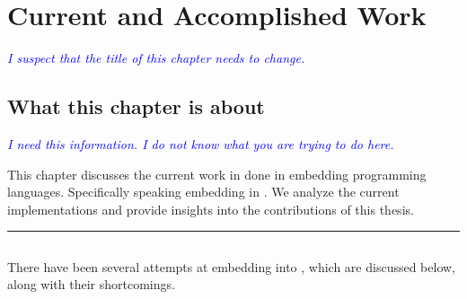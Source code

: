 \documentclass[thesis-solanki.tex]{subfiles}
\begin{document}
\chapter{Current and Accomplished Work}\label{chap:proposedWork}

\textcolor{blue}{\textsl{I suspect that the title of this chapter needs to change.}}

\section{What this chapter is about}\label{sec:what-this-chapter:proposedWork}

\textcolor{blue}{\textsl{I need this information.
    I do not know what you are trying to do here.
}}

This chapter discusses the current work in done in embedding programming languages.
Specifically speaking embedding  in .
We analyze the current implementations and provide insights into the contributions of this thesis.

\noindent\rule{\textwidth}{0.5pt}


\section{}

There have been several attempts at embedding  into , which are
discussed below, along with their shortcomings.
\end{document}
